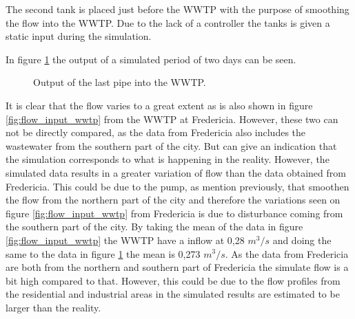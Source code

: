 The second tank is placed just before the WWTP with the purpose of smoothing the flow into the WWTP. %
Due to the lack of a controller the tanks is given a static input during the simulation.


In figure \ref{fig:simulation_output_first} the output of a simulated period of two days can be seen. 

\begin{figure}[H]
\centering

\caption{Output of the last pipe into the WWTP.}
\label{fig:simulation_output_first}
\end{figure}  

It is clear that the flow varies to a great extent as is also shown in figure \ref{fig:flow_input_wwtp} from the WWTP at Fredericia. However, these two can not be directly compared, as the data from Fredericia also includes the wastewater from the southern part of the city. But can give an indication that the simulation corresponds to what is happening in the reality. However, the simulated data results in a greater variation of flow than the data obtained from Fredericia. This could be due to the pump, as mention previously, that smoothen the flow from the northern part of the city and therefore the variations seen on figure \ref{fig:flow_input_wwtp} from Fredericia is due to disturbance coming from the southern part of the city. By taking the mean of the data in figure \ref{fig:flow_input_wwtp} the WWTP have a inflow at 0,28 $m^3/s$ and doing the same to the data in figure \ref{fig:simulation_output_first} the mean is 0,273 $m^3/s$. As the data from Fredericia are both from the northern and southern part of Fredericia the simulate flow is a bit high compared to that. However, this could be due to the flow profiles from the residential and industrial areas in the simulated results are estimated to be larger than the reality.     

